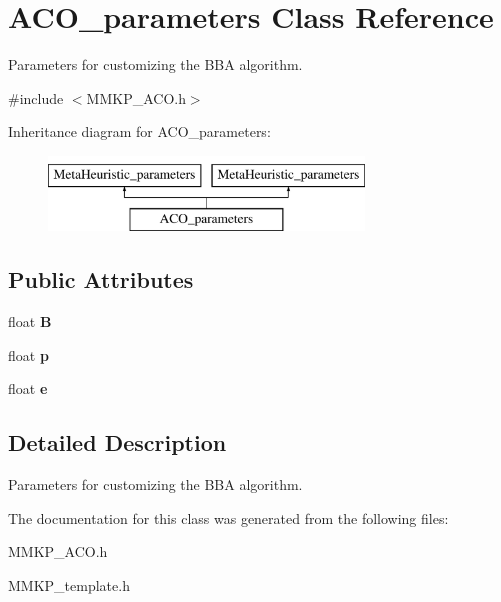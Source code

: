 \hypertarget{class_a_c_o__parameters}{\section{A\+C\+O\+\_\+parameters Class Reference}
\label{class_a_c_o__parameters}
}


Parameters for customizing the B\+B\+A algorithm.  




{\ttfamily \#include $<$M\+M\+K\+P\+\_\+\+A\+C\+O.\+h$>$}

Inheritance diagram for A\+C\+O\+\_\+parameters\+:\begin{figure}[H]
\begin{center}
\leavevmode
\includegraphics[height=2.000000cm]{class_a_c_o__parameters}
\end{center}
\end{figure}
\subsection*{Public Attributes}
\begin{DoxyCompactItemize}
\item 
\hypertarget{class_a_c_o__parameters_a8f79d15269b376621cddc45459249f66}{float {\bfseries B}}\label{class_a_c_o__parameters_a8f79d15269b376621cddc45459249f66}

\item 
\hypertarget{class_a_c_o__parameters_ad24b910f7578ae8c869b2e9c2e9cf0c7}{float {\bfseries p}}\label{class_a_c_o__parameters_ad24b910f7578ae8c869b2e9c2e9cf0c7}

\item 
\hypertarget{class_a_c_o__parameters_a441c9c99641ba9284457b5a8c04af4d5}{float {\bfseries e}}\label{class_a_c_o__parameters_a441c9c99641ba9284457b5a8c04af4d5}

\end{DoxyCompactItemize}


\subsection{Detailed Description}
Parameters for customizing the B\+B\+A algorithm. 

The documentation for this class was generated from the following files\+:\begin{DoxyCompactItemize}
\item 
M\+M\+K\+P\+\_\+\+A\+C\+O.\+h\item 
M\+M\+K\+P\+\_\+template.\+h\end{DoxyCompactItemize}
